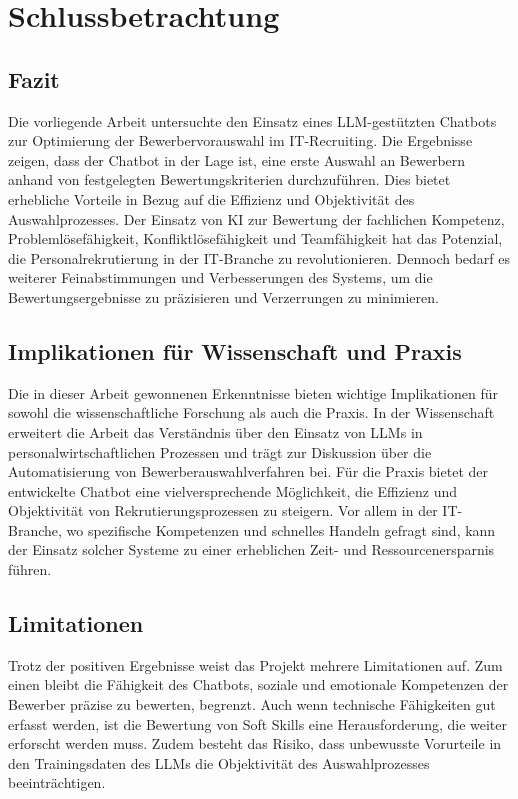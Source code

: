 
\chapter{Schlussbetrachtung}

\section{Fazit}

Die vorliegende Arbeit untersuchte den Einsatz eines \ac{LLM}-gestützten Chatbots zur Optimierung der Bewerbervorauswahl im IT-Recruiting. Die Ergebnisse zeigen, dass der Chatbot in der Lage ist, eine erste Auswahl an Bewerbern anhand von festgelegten Bewertungskriterien durchzuführen. Dies bietet erhebliche Vorteile in Bezug auf die Effizienz und Objektivität des Auswahlprozesses. Der Einsatz von \acs{KI} zur Bewertung der fachlichen Kompetenz, Problemlösefähigkeit, Konfliktlösefähigkeit und Teamfähigkeit hat das Potenzial, die Personalrekrutierung in der IT-Branche zu revolutionieren. Dennoch bedarf es weiterer Feinabstimmungen und Verbesserungen des Systems, um die Bewertungsergebnisse zu präzisieren und Verzerrungen zu minimieren.

\section{Implikationen für Wissenschaft und Praxis}

Die in dieser Arbeit gewonnenen Erkenntnisse bieten wichtige Implikationen für sowohl die wissenschaftliche Forschung als auch die Praxis. In der Wissenschaft erweitert die Arbeit das Verständnis über den Einsatz von LLMs in personalwirtschaftlichen Prozessen und trägt zur Diskussion über die Automatisierung von Bewerberauswahlverfahren bei. Für die Praxis bietet der entwickelte Chatbot eine vielversprechende Möglichkeit, die Effizienz und Objektivität von Rekrutierungsprozessen zu steigern. Vor allem in der IT-Branche, wo spezifische Kompetenzen und schnelles Handeln gefragt sind, kann der Einsatz solcher Systeme zu einer erheblichen Zeit- und Ressourcenersparnis führen.

\section{Limitationen}

Trotz der positiven Ergebnisse weist das Projekt mehrere Limitationen auf. Zum einen bleibt die Fähigkeit des Chatbots, soziale und emotionale Kompetenzen der Bewerber präzise zu bewerten, begrenzt. Auch wenn technische Fähigkeiten gut erfasst werden, ist die Bewertung von Soft Skills eine Herausforderung, die weiter erforscht werden muss. Zudem besteht das Risiko, dass unbewusste Vorurteile in den Trainingsdaten des \ac{LLM}s die Objektivität des Auswahlprozesses beeinträchtigen.

